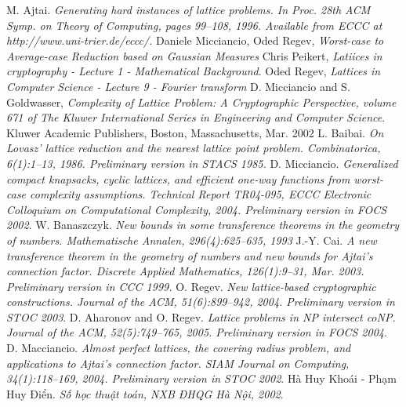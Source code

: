 \begin{thebibliography}{9}
	M. Ajtai. \textit{Generating hard instances of lattice problems. In Proc. 28th ACM Symp. on Theory of Computing, pages 99–108, 1996. Available from ECCC at http://www.uni-trier.de/eccc/.}
	 Daniele Micciancio, Oded Regev, \textit{Worst-case to Average-case Reduction based on Gaussian Measures} 
	 Chris Peikert, \textit{Latiices in cryptography - Lecture 1 - Mathematical Background}.
	 Oded Regev, \textit{Lattices in Computer Science - Lecture 9 - Fourier transform}
	 D. Micciancio and S. Goldwasser, \textit{Complexity of Lattice Problem: A Cryptographic Perspective, volume 671 of The Kluwer International Series in Engineering and Computer Science}. Kluwer Academic Publishers, Boston, Massachusetts, Mar. 2002
	 L. Baibai. \textit{On Lovasz' lattice reduction and the nearest lattice point problem. Combinatorica, 6(1):1–13, 1986. Preliminary version in STACS 1985.}
	 D. Micciancio. \textit{Generalized compact knapsacks, cyclic lattices, and efficient one-way functions from worst-case complexity assumptions. Technical Report TR04-095, ECCC Electronic Colloquium on Computational Complexity, 2004. Preliminary version in FOCS 2002}.
	W. Banaszczyk. \textit{New bounds in some transference theorems in the geometry of numbers. Mathematische Annalen, 296(4):625–635, 1993}
	J.-Y. Cai. \textit{A new transference theorem in the geometry of numbers and new bounds for Ajtai’s connection factor. Discrete Applied Mathematics, 126(1):9–31, Mar. 2003. Preliminary version in CCC 1999.}
	 O. Regev. \textit{New lattice-based cryptographic constructions. Journal of the ACM, 51(6):899–942, 2004. Preliminary version in STOC 2003}.
	 D. Aharonov and O. Regev. \textit{Lattice problems in NP intersect coNP. Journal of the ACM, 52(5):749–765, 2005. Preliminary version in FOCS 2004}.
	 D. Macciancio. \textit{Almost perfect lattices, the covering radius problem, and applications to Ajtai’s connection factor. SIAM Journal on Computing, 34(1):118–169, 2004. Preliminary version in STOC 2002}.
	 Hà Huy Khoái - Phạm Huy Điển. \textit{Số học thuật toán, NXB ĐHQG Hà Nội, 2002}.
\end{thebibliography}